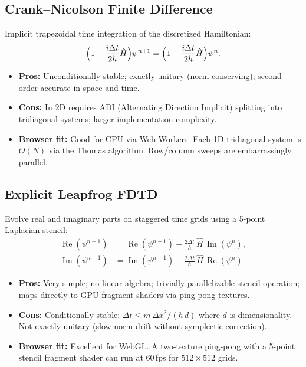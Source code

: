 \documentclass[11pt,a4paper]{article}
\begin{document}
\subsection{Crank--Nicolson Finite Difference}

Implicit trapezoidal time integration of the discretized Hamiltonian:
\begin{equation}
  \Bigl(1 + \frac{i\Delta t}{2\hbar}\hat{H}\Bigr)\psi^{n+1}
  = \Bigl(1 - \frac{i\Delta t}{2\hbar}\hat{H}\Bigr)\psi^n.
\end{equation}

\begin{itemize}
  \item \textbf{Pros:} Unconditionally stable; exactly unitary (norm-conserving); second-order accurate in space and time.
  \item \textbf{Cons:} In 2D requires ADI (Alternating Direction Implicit) splitting into tridiagonal systems; larger implementation complexity.
  \item \textbf{Browser fit:} Good for CPU via Web Workers. Each 1D tridiagonal system is $O(N)$ via the Thomas algorithm. Row/column sweeps are embarrassingly parallel.
\end{itemize}

\subsection{Explicit Leapfrog FDTD}

Evolve real and imaginary parts on staggered time grids using a 5-point Laplacian stencil:
\begin{align}
  \operatorname{Re}(\psi^{n+1})
    &= \operatorname{Re}(\psi^{n-1})
     + \frac{2\Delta t}{\hbar}\,\hat{H}\,\operatorname{Im}(\psi^n), \\[4pt]
  \operatorname{Im}(\psi^{n+1})
    &= \operatorname{Im}(\psi^{n-1})
     - \frac{2\Delta t}{\hbar}\,\hat{H}\,\operatorname{Re}(\psi^n).
\end{align}

\begin{itemize}
  \item \textbf{Pros:} Very simple; no linear algebra; trivially parallelizable stencil operation; maps directly to GPU fragment shaders via ping-pong textures.
  \item \textbf{Cons:} Conditionally stable: $\Delta t \le m\,\Delta x^2 / (\hbar\,d)$ where $d$ is dimensionality. Not exactly unitary (slow norm drift without symplectic correction).
  \item \textbf{Browser fit:} Excellent for WebGL. A two-texture ping-pong with a 5-point stencil fragment shader can run at 60\,fps for $512\times512$ grids.
\end{itemize}
\end{document}
